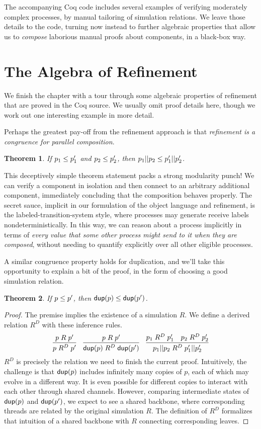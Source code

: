 \documentclass{amsbook}
\newtheorem{theorem}{Theorem}[chapter]
\theoremstyle{definition}
\theoremstyle{remark}
\numberwithin{section}{chapter}
\numberwithin{equation}{chapter}
\begin{document}
The accompanying Coq code includes several examples of verifying moderately complex processes, by manual tailoring of simulation relations.
We leave those details to the code, turning now instead to further algebraic properties that allow us to \emph{compose} laborious manual proofs about components, in a black-box way.


\section{The Algebra of Refinement}

We finish the chapter with a tour through some algebraic properties of refinement that are proved in the Coq source.
We usually omit proof details here, though we work out one interesting example in more detail.

Perhaps the greatest pay-off from the refinement approach is that \emph{refinement is a congruence for parallel composition}.
\begin{theorem}
  If $p_1 \leq p'_1$ and $p_2 \leq p'_2$, then $p_1 || p_2 \leq p'_1 || p'_2$.
\end{theorem}

\modularity
This deceptively simple theorem statement packs a strong modularity punch!
We can verify a component in isolation and then connect to an arbitrary additional component, immediately concluding that the composition behaves properly.
The secret sauce, implicit in our formulation of the object language and refinement, is the labeled-transition-system style, where processes may generate receive labels nondeterministically.
In this way, we can reason about a process implicitly in terms of \emph{every value that some other process might send to it when they are composed}, without needing to quantify explicitly over all other eligible processes.

A similar congruence property holds for duplication, and we'll take this opportunity to explain a bit of the proof, in the form of choosing a good simulation relation.
\begin{theorem}
  If $p \leq p'$, then $\mathsf{dup}(p) \leq \mathsf{dup}(p')$.
\end{theorem}
\begin{proof}
  The premise implies the existence of a simulation $R$.
  We define a derived relation $R^D$ with these inference rules.
  $$\infer{p \; R^D \; p'}{
    p \; R \; p'
  }
  \quad \infer{\dup{p} \; R^D \; \dup{p'}}{
    p \; R \; p'
  }
  \quad \infer{\parl{p_1}{p_2} \; R^D \; \parl{p'_1}{p'_2}}{
    p_1 \; R^D \; p'_1
    & p_2 \; R^D \; p'_2
  }$$
  $R^D$ is precisely the relation we need to finish the current proof.
  Intuitively, the challenge is that $\mathsf{dup}(p)$ includes infinitely many copies of $p$, each of which may evolve in a different way.
  It is even possible for different copies to interact with each other through shared channels.
  However, comparing intermediate states of $\mathsf{dup}(p)$ and $\mathsf{dup}(p')$, we expect to see a shared backbone, where corresponding threads are related by the original simulation $R$.
  The definition of $R^D$ formalizes that intuition of a shared backbone with $R$ connecting corresponding leaves.
\end{proof}
\end{document}
